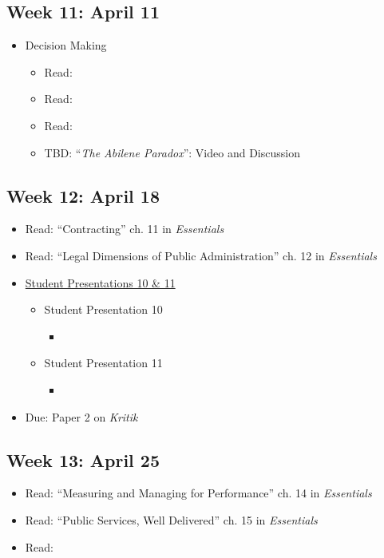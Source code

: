 \documentclass[10pt, letterpaper]{article}
\begin{document}
    \subsection*{Week 11: April 11}
    \begin{itemize}
        \item Decision Making
        \begin{itemize}
            \item Read: \cite{SIMON1965}
            \item Read: \cite{Lindblom1959}
            \item Read: \cite{OSTROM1971}
            \item TBD: ``\textit{The Abilene Paradox}'': Video and Discussion
        \end{itemize}
    \end{itemize}

    \subsection*{Week 12: April 18}
    \begin{itemize}
        \item Read: ``Contracting'' ch. 11 in \emph{Essentials}
        \item Read: ``Legal Dimensions of Public Administration'' ch. 12 in \emph{Essentials}
        \item \underline{Student Presentations 10 \& 11}
        \begin{itemize}
            \item Student Presentation 10
            \begin{itemize}
                \item \cite{ZEEMERING2018}
            \end{itemize}
            \item Student Presentation 11
            \begin{itemize}
                \item \cite{CHRISTENSEN2011}
            \end{itemize}
        \end{itemize}
        \item Due: Paper 2 on \emph{Kritik}
    \end{itemize}

    \subsection*{Week 13: April 25}
    \begin{itemize}
        \item Read: ``Measuring and Managing for Performance'' ch. 14 in \emph{Essentials}
        \item Read: ``Public Services, Well Delivered'' ch. 15 in \emph{Essentials}
        \item Read: \cite{YOUNG2020b}
        
    \end{itemize}           
\end{document}
